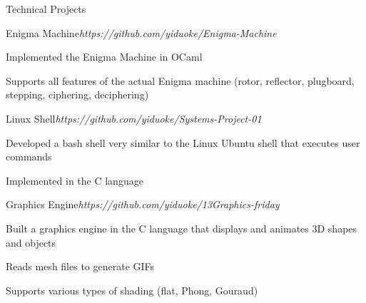 \documentclass{resume} %
\begin{document}
\begin{rSection}{Technical Projects}


\begin{rSubsection}{Enigma Machine}{\em https://github.com/yiduoke/Enigma-Machine}{}{}
\item Implemented the Enigma Machine in OCaml
\item Supports all features of the actual Enigma machine (rotor, reflector, plugboard, stepping, ciphering, deciphering)
\end{rSubsection}

\begin{rSubsection}{Linux Shell}{\em https://github.com/yiduoke/Systems-Project-01}{}{}
\item Developed a bash shell very similar to the Linux Ubuntu shell that executes user commands
\item Implemented in the C language
\end{rSubsection}

\begin{rSubsection}{Graphics Engine}{\em https://github.com/yiduoke/13Graphics-friday}{}{}
\item Built a graphics engine in the C language that displays and animates 3D shapes and objects
\item Reads mesh files to generate GIFs
\item Supports various types of shading (flat, Phong, Gouraud)
\end{rSubsection}




\end{rSection}
\end{document}
